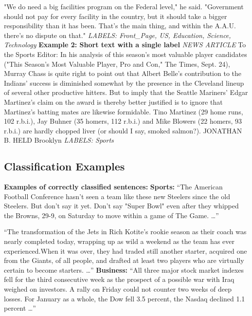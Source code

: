 \documentclass{article}
\begin{document}
"We do need a big facilities program on the Federal level," he said. "Government should not pay for every facility in the country, but it should take a bigger responsibility than it has been. That's the main thing, and within the A.A.U. there's no dispute on that."
\newline
\newline
\textit{LABELS: Front\_Page, US, Education, Science, Technology}
\newline
\newline
\textbf{Example 2: Short text with a single label} \label{appendix_example_2}
\newline
\newline
\textit{NEWS ARTICLE}
\newline
\newline
To the Sports Editor:
In his analysis of this season's most valuable player candidates ("This Season's Most Valuable Player, Pro and Con," The Times, Sept. 24), Murray Chass is quite right to point out that Albert Belle's contribution to the Indians' success is diminished somewhat by the presence in the Cleveland lineup of several other productive hitters. But to imply that the Seattle Mariners' Edgar Martinez's claim on the award is thereby better justified is to ignore that Martinez's batting mates are likewise formidable. Tino Martinez (29 home runs, 102 r.b.i.), Jay Buhner (35 homers, 112 r.b.i.) and Mike Blowers (22 homers, 93 r.b.i.) are hardly chopped liver (or should I say, smoked salmon?). JONATHAN B. HELD  Brooklyn
\newline
\newline
\textit{LABELS: Sports}

\subsection{Classification Examples} \label{appendix_classification_examples}
\textbf{Examples of correctly classified sentences:}
\newline
\newline
\textbf{Sports:}
\newline
\newline
“The American Football Conference hasn't seen a team like these new Steelers since the old Steelers. But don't say it yet. Don't say "Super Bowl" even after they whipped the Browns, 29-9, on Saturday to move within a game of The Game. …”

“The transformation of the Jets in Rich Kotite's rookie season as their coach was nearly completed today, wrapping up as wild a weekend as the team has ever experienced.When it was over, they had traded still another starter, acquired one from the Giants, of all people, and drafted at least two players who are virtually certain to become starters. …”
\newline
\newline
\textbf{Business:}
\newline
\newline
“All three major stock market indexes fell for the third consecutive week as the prospect of a possible war with Iraq weighed on investors. A rally on Friday could not counter two weeks of deep losses. For January as a whole, the Dow fell 3.5 percent, the Nasdaq declined 1.1 percent …”
\end{document}
